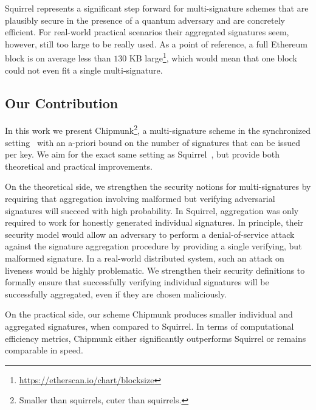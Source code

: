 Squirrel represents a significant step forward for multi-signature schemes that are plausibly secure in the presence of a quantum adversary and are concretely efficient.
For real-world practical scenarios their aggregated signatures seem, however, still too large to be really used.
As a point of reference, a full Ethereum block is on average less than $130$ KB large\footnote{\url{https://etherscan.io/chart/blocksize}}, which would mean that one block could not even fit a single multi-signature.

\subsection{Our Contribution}\label{sec:intro-contrib}
In this work we present Chipmunk\footnote{Smaller than squirrels, cuter than squirrels.}, a multi-signature scheme in the synchronized setting~\cite{PKC:GenRam06,CCS:AhnGreHoh10,EC:HohWat18,USENIX:DGNW20} with an a-priori bound on the number of signatures that can be issued per key. 
We aim for the exact same setting as Squirrel~\cite{CCS:FleSimZha22}, but provide both theoretical and practical improvements.

On the theoretical side, we strengthen the security notions for multi-signatures by requiring that aggregation involving malformed but verifying adversarial signatures will succeed with high probability. 
In Squirrel, aggregation was only required to work for honestly generated individual signatures. 
In principle, their security model would allow an adversary to perform a denial-of-service attack against the signature aggregation procedure by providing a single verifying, but malformed signature.
In a real-world distributed system, such an attack on liveness would be highly problematic.
We strengthen their security definitions to formally ensure that successfully verifying individual signatures will be successfully aggregated, even if they are chosen maliciously. 

On the practical side, our scheme Chipmunk produces smaller individual and aggregated signatures, when compared to Squirrel.
In terms of computational efficiency metrics, Chipmunk either significantly outperforms Squirrel or remains comparable in speed.

